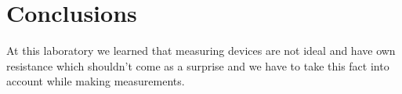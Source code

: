 \section{Conclusions}

At this laboratory we learned that measuring devices are not ideal and have own resistance which shouldn’t come as a surprise and we have to take this fact into account while making measurements.